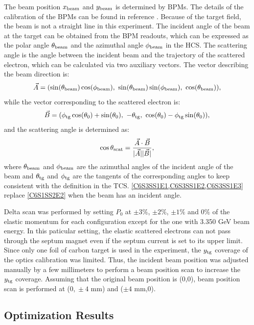 The beam position $x_{\mathrm{beam}}$ and $y_{\mathrm{beam}}$ is determined by BPMs. The details of the calibration of the BPMs can be found in reference \cite{Zhu2016}. Because of the target field, the beam is not a straight line in this experiment. The incident angle of the beam at the target can be obtained from the BPM readouts, which can be expressed as the polar angle $\theta_{\mathrm{beam}}$ and the azimuthal angle $\phi_{\mathrm{beam}}$ in the HCS. The scattering angle is the angle between the incident beam and the trajectory of the scattered electron, which can be calculated via two auxiliary vectors. The vector describing the beam direction is:
\begin{equation} \label{C6S3SS1E1}
\vec{A} = (\sin(\optt{beam})\cos(\optp{beam}),\ \sin(\optt{beam})\sin(\optp{beam}),\ \cos(\optt{beam})),
\end{equation}
while the vector corresponding to the scattered electron is:
\begin{equation} \label{C6S3SS1E2}
\vec{B} = (\optp{tg}\cos(\theta_0)+\sin(\theta_0),\ -\optt{tg},\ \cos(\theta_0)-\optp{tg}\sin(\theta_0)),
\end{equation}
and the scattering angle is determined as:
\begin{equation} \label{C6S3SS1E3}
\cos\theta_{\mathrm{scat}} = \frac{\vec{A}\cdot\vec{B}}{|\vec{A}||\vec{B}|},
\end{equation}
where $\theta_{\mathrm{beam}}$ and $\phi_{\mathrm{beam}}$ are the azimuthal angles of the incident angle of the beam and $\theta_{\mathrm{tg}}$ and $\phi_{\mathrm{tg}}$ are the tangents of the corresponding angles to keep consistent with the definition in the TCS. \cref{C6S3SS1E1,C6S3SS1E2,C6S3SS1E3} replace \cref{C6S1SS2E2} when the beam has an incident angle.

Delta scan was performed by setting $P_0$ at $\pm 3\%$, $\pm 2\%$, $\pm 1\%$ and $0\%$ of the elastic momentum for each configuration except for the one with 3.350 GeV beam energy. In this paticular setting, the elastic scattered electrons can not pass through the septum magnet even if the septum current is set to its upper limit. Since only one foil of carbon target is used in the experiment, the $y_{\mathrm{tg}}$ coverage of the optics calibration was limited. Thus, the incident beam position was adjusted manually by a few millimeters to perform a beam position scan to increase the $y_{\mathrm{tg}}$ coverage. Assuming that the original beam position is (0,0), beam position scan is performed at (0,$\ \pm 4$ mm) and ($\pm 4$ mm,0).

\subsection{Optimization Results}
\label{C6S3SS2}

